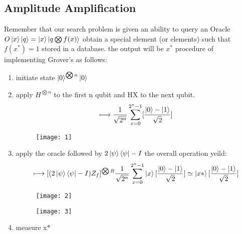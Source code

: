\documentclass[11pt]{article}
\begin{document}
\subsection{Amplitude Amplification}
Remember that our search problem is given an ability to query an Oracle $O\ket{x}\ket{q}=\ket{x}\ket{q\bigotimes f(x)}$ obtain a special element (or elements) such that $f(x^*)=1$ stored in a database. the output will be $x^*$ procedure of implementing Grover's as follows:
\begin{enumerate}
	\item initiate state $\ket{0}^{\bigotimes n}\ket{0}$
	\item apply $H^{\bigotimes n}$ to the first n qubit and HX to the next qubit.
	\begin{equation*}
	\longmapsto \frac{1}{\sqrt{2^n}}\sum_{x=0}^{2^n-1}[\frac{\ket{0}-\ket{1}}{\sqrt{2}}]
	\end{equation*}
	\begin{figure}[h!]
		\texttt{[image: 1]}
		\centering
	\end{figure}
    \item apply the oracle followed by $2\ket{\psi}\bra{\psi}-I$ the overall operation yeild:
    \begin{equation}
    \longmapsto [(2\ket{\psi}\bra{\psi}-I)Z_f]^{\bigotimes R} \frac{1}{\sqrt{2^n}}\sum_{x=0}^{2^n-1}\ket{x}[\frac{\ket{0}-\ket{1}}{\sqrt{2}}] \simeq \ket{x*}[\frac{\ket{0}-\ket{1}}{\sqrt{2}}]
    \end{equation}
    \begin{figure}[h!]
     	\texttt{[image: 2]}
     	\centering
    \end{figure}
\begin{figure}[h!]
	\texttt{[image: 3]}
	\centering
\end{figure}
\item measure x*
\end{enumerate}
\end{document}
